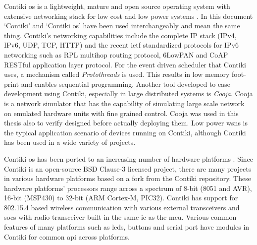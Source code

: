 Contiki \gls{os} is a lightweight, mature and open source operating system with extensive networking stack for low cost and low power systems \cite{Contiki}. In this document `Contiki' and `Contiki \gls{os}' have been used interchangeably and mean the same thing. Contiki's networking capabilities include the complete IP stack (IPv4, IPv6, UDP, TCP, HTTP) and the recent \gls{ietf} standardized protocols for IPv6 networking such as RPL multihop routing protocol, 6LowPAN and CoAP RESTful application layer protocol. For the event driven scheduler that Contiki uses, a mechanism called \emph{Protothreads} is used. This results in low memory foot-print and enables sequential programming. Another tool developed to ease development using Contiki, especially in large distributed systems is \emph{Cooja}. Cooja is a network simulator that has the capability of simulating large scale network on emulated hardware units with fine grained control. Cooja was used in this thesis also to verify designed before actually deploying them. Low power \glspl{wsn} is the typical application scenario of devices running on Contiki, although Contiki has been used in a wide variety of projects.

Contiki \gls{os} has been ported to an increasing number of hardware platforms  \cite{contikiHw}. Since Contiki is an open-source BSD Clause-3 licensed project, there are many projects in various hardware platforms based on a fork from the Contiki repository. These hardware platforms' processors range across a spectrum of 8-bit (8051 and AVR), 16-bit (MSP430) to 32-bit (ARM Cortex-M, PIC32). Contiki has support for 802.15.4 based wireless communication with various external transceivers and \glspl{soc} with radio transceiver built in the same \gls{ic} as the \gls{mcu}. Various common features of many platforms such as \glspl{led}, buttons and serial port have modules in Contiki for common \gls{api} across platforms.


